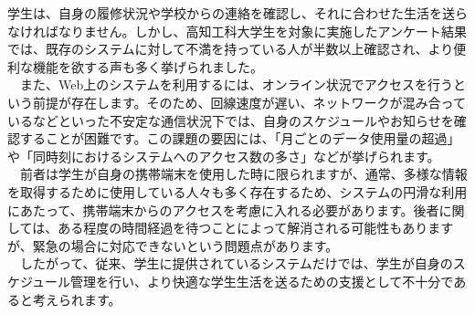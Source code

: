 学生は、自身の履修状況や学校からの連絡を確認し、それに合わせた生活を送らなければなりません。しかし、高知工科大学生を対象に実施したアンケート結果では、既存のシステムに対して不満を持っている人が半数以上確認され、より便利な機能を欲する声も多く挙げられました。\\
　また、Web上のシステムを利用するには、オンライン状況でアクセスを行うという前提が存在します。そのため、回線速度が遅い、ネットワークが混み合っているなどといった不安定な通信状況下では、自身のスケジュールやお知らせを確認することが困難です。この課題の要因には、「月ごとのデータ使用量の超過」や「同時刻におけるシステムへのアクセス数の多さ」などが挙げられます。\\
　前者は学生が自身の携帯端末を使用した時に限られますが、通常、多様な情報を取得するために使用している人々も多く存在するため、システムの円滑な利用にあたって、携帯端末からのアクセスを考慮に入れる必要があります。後者に関しては、ある程度の時間経過を待つことによって解消される可能性もありますが、緊急の場合に対応できないという問題点があります。\\
　したがって、従来、学生に提供されているシステムだけでは、学生が自身のスケジュール管理を行い、より快適な学生生活を送るための支援として不十分であると考えられます。
